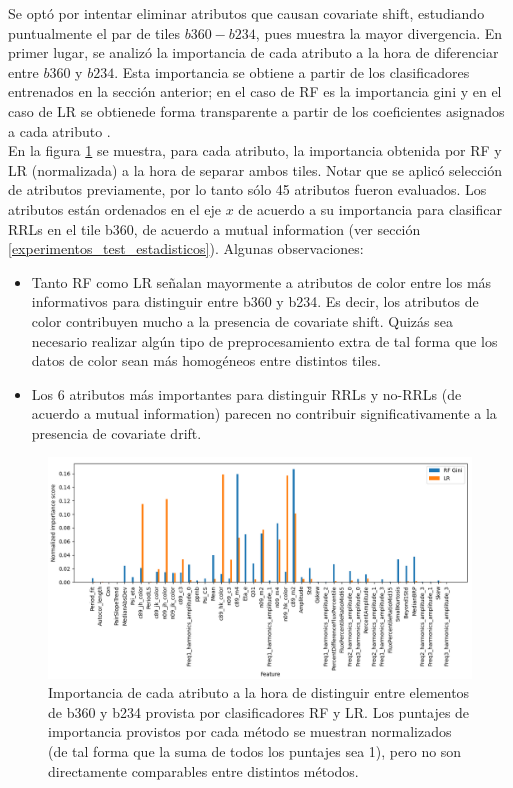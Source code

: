 Se optó por intentar eliminar atributos que causan covariate shift, estudiando puntualmente el par de tiles $b360-b234$, pues muestra la mayor divergencia. En primer lugar, se analizó la importancia de cada atributo a la hora de diferenciar entre $b360$ y $b234$. Esta importancia se obtiene a partir de los clasificadores entrenados en la sección anterior; en el caso de RF es la importancia gini y en el caso de LR se obtienede forma transparente a partir de los coeficientes asignados a cada atributo \cite{molnar2019}. \\

En la figura \ref{fig:covariate_ranking} se muestra, para cada atributo, la importancia obtenida por RF y LR (normalizada) a la hora de separar ambos tiles. Notar que se aplicó selección de atributos previamente, por lo tanto sólo 45 atributos fueron evaluados. Los atributos están ordenados en el eje $x$ de acuerdo a su importancia para clasificar RRLs en el tile b360, de acuerdo a mutual information (ver sección \ref{experimentos_test_estadisticos}). Algunas observaciones:

\begin{itemize}
\item Tanto RF como LR señalan mayormente a atributos de color entre los más informativos para distinguir entre b360 y b234. Es decir, los atributos de color contribuyen mucho a la presencia de covariate shift. Quizás sea necesario realizar algún tipo de preprocesamiento extra de tal forma que los datos de color sean más homogéneos entre distintos tiles.
\item Los 6 atributos más importantes para distinguir RRLs y no-RRLs (de acuerdo a mutual information) parecen no contribuir significativamente a la presencia de covariate drift.
\end{itemize}

\begin{figure}[h!]
\centering
  \includegraphics[width=\textwidth]{Kap8/shift_scores.png}  
\caption{Importancia de cada atributo a la hora de distinguir entre elementos de b360 y b234 provista por clasificadores RF y LR. Los puntajes de importancia provistos por cada método se muestran normalizados (de tal forma que la suma de todos los puntajes sea 1), pero no son directamente comparables entre distintos métodos.}
\label{fig:covariate_ranking}
\end{figure}

